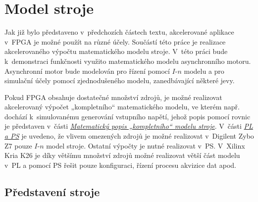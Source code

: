 \documentclass[a4paper, twoside, 11pt]{article}
\begin{document}
\section{Model stroje}
	Jak již bylo představeno v~předchozích částech textu, akcelerované aplikace v~FPGA je možné použít na různé účely. Součástí této práce je realizace akcelerovaného výpočtu matematického modelu stroje. V~této práci bude k~demonstraci funkčnosti využito matematického modelu asynchronního motoru. Asynchronní motor bude modelován pro řízení pomocí $I$-$n$ modelu a pro simulační účely pomocí zjednodušeného modelu, zanedbávající některé jevy.\par
	Pokud FPGA obsahuje dostatečné množství zdrojů, je možné realizovat akcelerovaný výpočet „kompletního“ matematického modelu, ve kterém např. dochází k~simulovanému generování vstupního napětí, jehož popis pomocí rovnic je představen v~části \hyperref[subsec:matematicky-popis-kompletniho-modelu-stroje]{\textit{Matematický popis „kompletního“ modelu stroje}}. V~části \hyperref[subsec:ps-a-pl]{\textit{PL a PS}} je uvedeno, že vlivem omezených zdrojů je možné realizovat v~Digilent Zybo Z7 pouze $I$-$n$ model stroje. Ostatní výpočty je nutné realizovat v~PS. V~Xilinx Kria K26 je díky většímu množství zdrojů možné realizovat větší část modelu v~PL a pomocí PS řešit pouze konfiguraci, řízení procesu akvizice dat apod.\par
	\subsection{Představení stroje}
\end{document}
